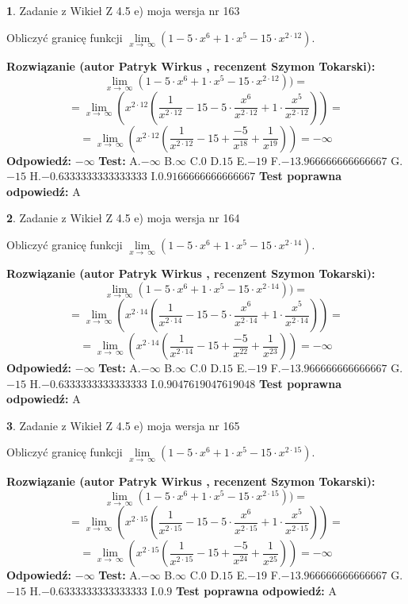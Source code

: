 \documentclass[12pt, a4paper]{article}
\theoremstyle{definition} %
\newtheorem{zad}{}
\newcommand{\zadStart}[1]{\begin{zad}#1\newline}
\newcommand{\zadStop}{\end{zad}}
\newcommand{\rozwStart}[2]{\noindent \textbf{Rozwiązanie (autor #1 , recenzent #2): }\newline}
\newcommand{\rozwStop}{\newline}
\newcommand{\odpStart}{\noindent \textbf{Odpowiedź:}\newline}
\newcommand{\odpStop}{\newline}
\newcommand{\testStart}{\noindent \textbf{Test:}\newline}
\newcommand{\testStop}{\newline}
\newcommand{\kluczStart}{\noindent \textbf{Test poprawna odpowiedź:}\newline}
\newcommand{\kluczStop}{\newline}
\begin{document}
\zadStart{Zadanie z Wikieł Z 4.5 e) moja wersja nr 163}


Obliczyć granicę funkcji  $\lim\limits_{x\to\ \infty}(1 - 5 \cdot x^{6}+1 \cdot x^{5}- 15 \cdot x^{2\cdot12})$.
\zadStop
\rozwStart{Patryk Wirkus}{Szymon Tokarski}
$$\lim\limits_{x\to\ \infty}(1 - 5 \cdot x^{6}+1 \cdot x^{5}- 15 \cdot x^{2\cdot12}))=$$
$$=\lim\limits_{x\to\ \infty}(x^{2\cdot12}(\frac{1}{x^{2\cdot12}}-15 -5 \cdot \frac{x^{6}}{x^{2\cdot12}}+1 \cdot \frac{x^{5}}{x^{2\cdot12}}))=$$
$$=\lim\limits_{x\to\ \infty}(x^{2\cdot12}(\frac{1}{x^{2\cdot12}}-15 + \frac{-5}{x^{18}}+ \frac{1}{x^{19}}))=-\infty$$
\rozwStop
\odpStart
$-\infty$
\odpStop
\testStart
A.$-\infty$ B.$\infty$ C.$0$ D.$15$ E.$-19$
F.$-13.966666666666667$ G.$-15$
H.$-0.6333333333333333$
I.$0.9166666666666667$
\testStop
\kluczStart
A
\kluczStop



\zadStart{Zadanie z Wikieł Z 4.5 e) moja wersja nr 164}


Obliczyć granicę funkcji  $\lim\limits_{x\to\ \infty}(1 - 5 \cdot x^{6}+1 \cdot x^{5}- 15 \cdot x^{2\cdot14})$.
\zadStop
\rozwStart{Patryk Wirkus}{Szymon Tokarski}
$$\lim\limits_{x\to\ \infty}(1 - 5 \cdot x^{6}+1 \cdot x^{5}- 15 \cdot x^{2\cdot14}))=$$
$$=\lim\limits_{x\to\ \infty}(x^{2\cdot14}(\frac{1}{x^{2\cdot14}}-15 -5 \cdot \frac{x^{6}}{x^{2\cdot14}}+1 \cdot \frac{x^{5}}{x^{2\cdot14}}))=$$
$$=\lim\limits_{x\to\ \infty}(x^{2\cdot14}(\frac{1}{x^{2\cdot14}}-15 + \frac{-5}{x^{22}}+ \frac{1}{x^{23}}))=-\infty$$
\rozwStop
\odpStart
$-\infty$
\odpStop
\testStart
A.$-\infty$ B.$\infty$ C.$0$ D.$15$ E.$-19$
F.$-13.966666666666667$ G.$-15$
H.$-0.6333333333333333$
I.$0.9047619047619048$
\testStop
\kluczStart
A
\kluczStop



\zadStart{Zadanie z Wikieł Z 4.5 e) moja wersja nr 165}


Obliczyć granicę funkcji  $\lim\limits_{x\to\ \infty}(1 - 5 \cdot x^{6}+1 \cdot x^{5}- 15 \cdot x^{2\cdot15})$.
\zadStop
\rozwStart{Patryk Wirkus}{Szymon Tokarski}
$$\lim\limits_{x\to\ \infty}(1 - 5 \cdot x^{6}+1 \cdot x^{5}- 15 \cdot x^{2\cdot15}))=$$
$$=\lim\limits_{x\to\ \infty}(x^{2\cdot15}(\frac{1}{x^{2\cdot15}}-15 -5 \cdot \frac{x^{6}}{x^{2\cdot15}}+1 \cdot \frac{x^{5}}{x^{2\cdot15}}))=$$
$$=\lim\limits_{x\to\ \infty}(x^{2\cdot15}(\frac{1}{x^{2\cdot15}}-15 + \frac{-5}{x^{24}}+ \frac{1}{x^{25}}))=-\infty$$
\rozwStop
\odpStart
$-\infty$
\odpStop
\testStart
A.$-\infty$ B.$\infty$ C.$0$ D.$15$ E.$-19$
F.$-13.966666666666667$ G.$-15$
H.$-0.6333333333333333$
I.$0.9$
\testStop
\kluczStart
A
\kluczStop
\end{document}
